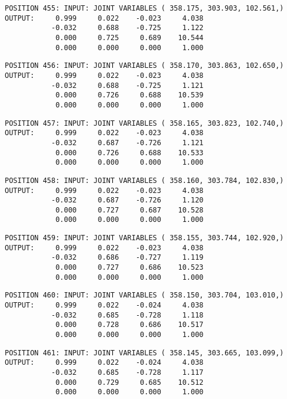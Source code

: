\begin{verbatim}
POSITION 455: INPUT: JOINT VARIABLES ( 358.175, 303.903, 102.561,)
OUTPUT:     0.999     0.022    -0.023     4.038
           -0.032     0.688    -0.725     1.122
            0.000     0.725     0.689    10.544
            0.000     0.000     0.000     1.000
\end{verbatim} \pagebreak[1]\begin{verbatim}
POSITION 456: INPUT: JOINT VARIABLES ( 358.170, 303.863, 102.650,)
OUTPUT:     0.999     0.022    -0.023     4.038
           -0.032     0.688    -0.725     1.121
            0.000     0.726     0.688    10.539
            0.000     0.000     0.000     1.000
\end{verbatim} \pagebreak[1]\begin{verbatim}
POSITION 457: INPUT: JOINT VARIABLES ( 358.165, 303.823, 102.740,)
OUTPUT:     0.999     0.022    -0.023     4.038
           -0.032     0.687    -0.726     1.121
            0.000     0.726     0.688    10.533
            0.000     0.000     0.000     1.000
\end{verbatim} \pagebreak[1]\begin{verbatim}
POSITION 458: INPUT: JOINT VARIABLES ( 358.160, 303.784, 102.830,)
OUTPUT:     0.999     0.022    -0.023     4.038
           -0.032     0.687    -0.726     1.120
            0.000     0.727     0.687    10.528
            0.000     0.000     0.000     1.000
\end{verbatim} \pagebreak[1]\begin{verbatim}
POSITION 459: INPUT: JOINT VARIABLES ( 358.155, 303.744, 102.920,)
OUTPUT:     0.999     0.022    -0.023     4.038
           -0.032     0.686    -0.727     1.119
            0.000     0.727     0.686    10.523
            0.000     0.000     0.000     1.000
\end{verbatim} \pagebreak[1]\begin{verbatim}
POSITION 460: INPUT: JOINT VARIABLES ( 358.150, 303.704, 103.010,)
OUTPUT:     0.999     0.022    -0.024     4.038
           -0.032     0.685    -0.728     1.118
            0.000     0.728     0.686    10.517
            0.000     0.000     0.000     1.000
\end{verbatim} \pagebreak[1]\begin{verbatim}
POSITION 461: INPUT: JOINT VARIABLES ( 358.145, 303.665, 103.099,)
OUTPUT:     0.999     0.022    -0.024     4.038
           -0.032     0.685    -0.728     1.117
            0.000     0.729     0.685    10.512
            0.000     0.000     0.000     1.000
\end{verbatim} \pagebreak[1]\begin{verbatim}

\end{verbatim}

